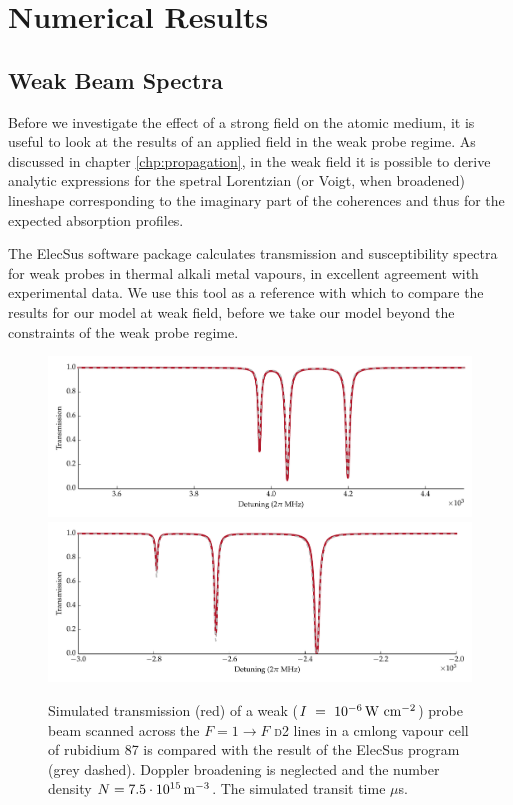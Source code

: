 \section{Numerical Results}
  \label{sec:twophoton_results}

  \subsection{Weak Beam Spectra}

    Before we investigate the effect of a strong field on the atomic medium, it
    is useful to look at the results of an applied field in the weak probe
    regime. As discussed in chapter \ref{chp:propagation}, in the weak field it
    is possible to derive analytic expressions for the spetral Lorentzian (or
    Voigt, when broadened)  lineshape corresponding to the imaginary part of the
    coherences and thus for the expected absorption profiles.

    The ElecSus software package\cite{Zentile2015} calculates transmission and
    susceptibility spectra for weak probes in thermal alkali metal vapours, in
    excellent agreement with experimental data.\cite{Siddons2008,Weller2011} We
    use this tool as a reference with which to compare the results for our
    model at weak field, before we take our model beyond the constraints of the
    weak probe regime.

    \begin{figure}[]
    \includegraphics[width=\linewidth]
        {figs/05_twophoton/rb87_d2_hf_solve_scan_g2a_fig3.pdf}
    \includegraphics[width=\linewidth]
        {figs/05_twophoton/rb87_d2_hf_solve_scan_h1a_fig3.pdf}
    \caption{
    Simulated transmission (red) of a weak ($I~=~\unit[10^{-6}]{W~cm^{-2}}$)
    probe beam scanned across the  $F = 1 \rightarrow F$ \textsc{d2} lines in a
    \unit[1]{cm}long vapour cell of rubidium 87 is compared with the result of
    the ElecSus program (grey dashed). Doppler broadening is neglected and the
    number density $N = \unit[7.5\cdot10^{15}]{m^{-3}}$. The simulated transit
    time \unit[2]{$\mu$s}.
    }
    \label{fig:weak_d2} 
    \end{figure}

